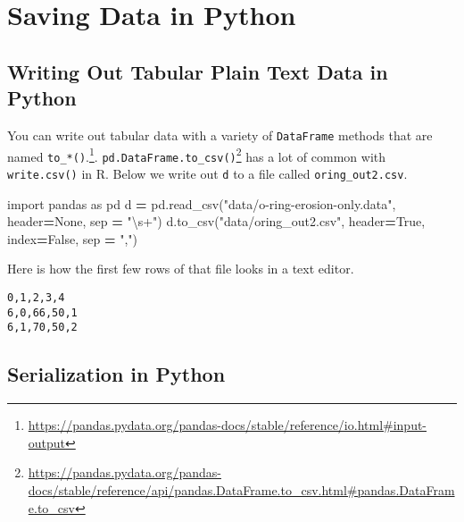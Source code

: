 \documentclass[12pt,krantz2]{krantz}
\makeatletter
\newenvironment{Shaded}{\begin{snugshade}}{\end{snugshade}}
\newcommand{\ImportTok}[1]{#1}
\newcommand{\NormalTok}[1]{#1}
\newcommand{\OperatorTok}[1]{\textcolor[rgb]{0.43,0.43,0.43}{\textbf{#1}}}
\newcommand{\StringTok}[1]{\textcolor[rgb]{0.5,0.5,0.5}{#1}}
\newcommand{\VariableTok}[1]{\textcolor[rgb]{0,0,0}{#1}}
\renewcommand{\href}[2]{#2\footnote{\url{#1}}}
\newenvironment{kframe}{%
\medskip{}
\setlength{\fboxsep}{.8em}
 \def\at@end@of@kframe{}%
 \ifinner\ifhmode%
  \def\at@end@of@kframe{\end{minipage}}%
  \begin{minipage}{\columnwidth}%
 \fi\fi%
 \def\FrameCommand##1{\hskip\@totalleftmargin \hskip-\fboxsep
 \colorbox{shadecolor}{##1}\hskip-\fboxsep
     \hskip-\linewidth \hskip-\@totalleftmargin \hskip\columnwidth}%
 \MakeFramed {\advance\hsize-\width
   \@totalleftmargin\z@ \linewidth\hsize
   \@setminipage}}%
 {\par\unskip\endMakeFramed%
 \at@end@of@kframe}
\renewenvironment{Shaded}{\begin{kframe}}{\end{kframe}}
\makeatother
\begin{document}
\hypertarget{saving-data-in-python}{%
\section{Saving Data in Python}\label{saving-data-in-python}}

\hypertarget{writing-out-tabular-plain-text-data-in-python}{%
\subsection{Writing Out Tabular Plain Text Data in Python}\label{writing-out-tabular-plain-text-data-in-python}}

You can write out tabular data with a variety of \href{https://pandas.pydata.org/pandas-docs/stable/reference/io.html\#input-output}{\texttt{DataFrame} methods that are named \texttt{to\_*()}.}. \href{https://pandas.pydata.org/pandas-docs/stable/reference/api/pandas.DataFrame.to_csv.html\#pandas.DataFrame.to_csv}{\texttt{pd.DataFrame.to\_csv()}} has a lot of common with \texttt{write.csv()} in R. Below we write out \texttt{d} to a file called \texttt{oring\_out2.csv}.

\begin{Shaded}
\begin{Highlighting}[]
\ImportTok{import}\NormalTok{ pandas }\ImportTok{as}\NormalTok{ pd}
\NormalTok{d }\OperatorTok{=}\NormalTok{ pd.read_csv(}\StringTok{"data/o-ring-erosion-only.data"}\NormalTok{, }
\NormalTok{                  header}\OperatorTok{=}\VariableTok{None}\NormalTok{, sep }\OperatorTok{=} \StringTok{"\textbackslash{}s+"}\NormalTok{)}
\NormalTok{d.to_csv(}\StringTok{"data/oring_out2.csv"}\NormalTok{, }
\NormalTok{          header}\OperatorTok{=}\VariableTok{True}\NormalTok{, index}\OperatorTok{=}\VariableTok{False}\NormalTok{, sep }\OperatorTok{=} \StringTok{","}\NormalTok{)}
\end{Highlighting}
\end{Shaded}

Here is how the first few rows of that file looks in a text editor.

\begin{verbatim}
0,1,2,3,4
6,0,66,50,1
6,1,70,50,2
\end{verbatim}

\hypertarget{serialization-in-python}{%
\subsection{Serialization in Python}\label{serialization-in-python}}
\end{document}
